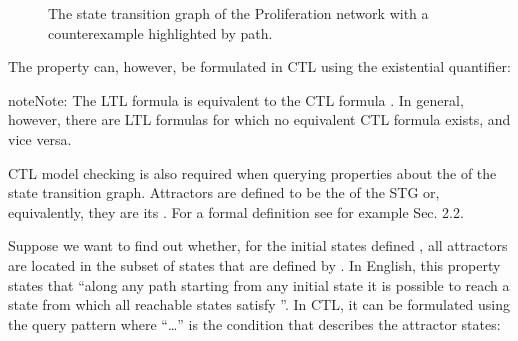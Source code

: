 \documentclass[letterpaper,10pt,english]{sphinxmanual}
\begin{document}
\begin{figure}[htbp]
\centering
\capstart

\noindent{}
\caption{The state transition graph  of the Proliferation network with a counterexample highlighted by path.}\label{\detokenize{Manual:figure21}}\label{\detokenize{Manual:id25}}\end{figure}

The property can, however, be formulated in CTL using the existential quantifier:

\begin{sphinxVerbatim}[commandchars=\\\{\}]
  
     
\end{sphinxVerbatim}

\begin{sphinxadmonition}{note}{Note:}
The LTL formula  is equivalent to the CTL formula .
In general, however, there are LTL formulas for which no equivalent CTL formula exists, and vice versa.
\end{sphinxadmonition}

CTL model checking is also required when querying properties about the  of the state transition graph.
Attractors are defined to be the  of the STG or, equivalently, they are its .
For a formal definition see for example {\hyperref[\detokenize{Bibliography:klarner2015approx}]{}} Sec. 2.2.

Suppose we want to find out whether, for the initial states defined ,
all attractors are located in the subset of states that are defined by .
In English, this property states that “along any path starting from any initial state it is possible to reach a state from
which all reachable states satisfy ”.
In CTL, it can be formulated using the  query pattern where “…” is the condition that describes the attractor states:
\end{document}
